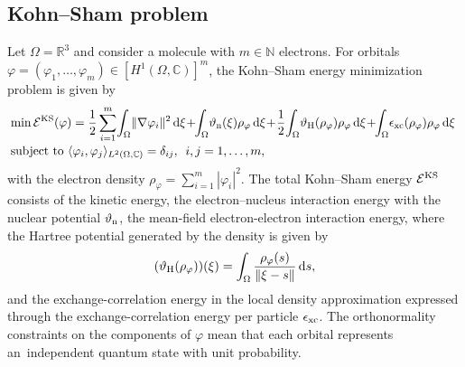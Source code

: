 \documentclass[11pt,reqno]{amsart}
\theoremstyle{plain}
\newcommand\C{\mathbb C}
\def\dxi{\,\text{d}\xi}
\def\ds{\,\text{d}s}
\newcommand\calE{\mathcal E}
\newcommand{\KS}{{\rm KS}}
\begin{document}
	
	\subsection{Kohn--Sham problem}
	Let $\Omega = \mathbb R^3$ and consider a molecule with $m\in \mathbb N$ electrons. For orbitals $\varphi = (\varphi_1, \dots , \varphi_m) \in [H^1(\Omega,\C)]^m$, the Kohn--Sham energy minimization problem is given by
	\begin{equation}\label{eq:dis_minE_KS}
		\hspace*{-1mm}\begin{array}{l}
			\displaystyle{    \min \calE^{\KS}(\varphi) 
				= \frac{1}{2} \sum\limits_{i = 1}^m \!\int_\Omega \!\|\nabla \varphi_i\|^2\dxi 
				\!+\!\! \int_\Omega\!\vartheta_{\rm n}(\xi) \rho_\varphi\dxi 
				\!+\! \frac{1}{2}\! \int_{\Omega}\!
				\vartheta_{\rm H} (\rho_\varphi)\rho_\varphi \dxi
				\!+\!\! \int_{\Omega}\! \epsilon_{\rm xc}(\rho_\varphi)\rho_\varphi \dxi}\\[4mm]
			\text{subject to } \langle \varphi_i, \varphi_j\rangle_{L^2(\Omega,\C)}= \delta_{ij},\enskip i,j=1,\ldots, m,
		\end{array}
	\end{equation}
	with the electron density $\rho_\varphi = \sum_{i = 1}^m |\varphi_i|^2$. The total Kohn--Sham energy $\calE^{\KS}$ consists of 
	the kinetic energy, 
	the electron–nucleus interaction energy with the nuclear potential $\vartheta_{\rm n}$, 
	the mean-field electron-electron interaction energy, where the Hartree potential generated by the density is given by 
	\[
	(\vartheta_{\rm H}(\rho_\varphi))(\xi) = \int_\Omega \frac{\rho_\varphi(s)}{\|\xi-s\|}\ds,
	\]
	and the exchange-correlation energy in the local density approximation expressed through the exchange-correlation energy per particle $\epsilon_{\rm xc}$. The orthonormality constraints on the components of $\varphi$ mean that each orbital represents an~independent quantum state with unit probability.
	
\end{document}
